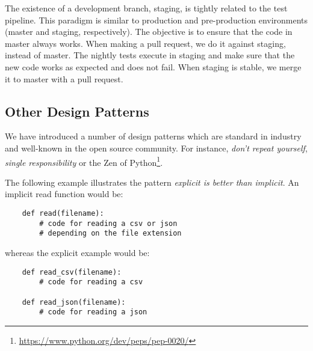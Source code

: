 The existence of a development branch, staging, is tightly related to the test pipeline. This paradigm is similar to
production and pre-production environments (master and staging, respectively).
The objective is to ensure that the code in master always works. When making a pull request, we 
do it against staging, instead of master. The nightly tests execute in staging and make sure that the new code 
works as expected and does not fail. When staging is stable, we merge it to master with a pull request.  


\subsection{Other Design Patterns}

We have introduced a number of design patterns which are standard in industry and well-known
in the open source community. For instance, \textit{don't repeat yourself}, \textit{single
responsibility} or the Zen of Python\footnote{\url{https://www.python.org/dev/peps/pep-0020/}}. 

The following example illustrates the pattern \textit{explicit is better than implicit}.
An implicit read function would be: 
\begin{verbatim}
    def read(filename):
        # code for reading a csv or json
        # depending on the file extension
\end{verbatim}

whereas the explicit example would be:
\begin{verbatim}
    def read_csv(filename):
        # code for reading a csv

    def read_json(filename):
        # code for reading a json
\end{verbatim}



